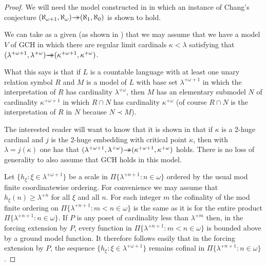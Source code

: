 \documentclass{rmmcart}
\theoremstyle{plain}
\theoremstyle{definition}
\theoremstyle{remark}
\theoremstyle{plain}
\theoremstyle{definition}
\theoremstyle{remark}
\begin{document}
            \begin{proof}
            We will need the model constructed in \cite{MR1045371} in
             which an instance of Chang's conjecture
             $(\aleph_{\omega+1},\aleph_\omega) \rlap{$\rightarrow$}\,{\rightarrow}
             (\aleph_1,\aleph_0)$ is shown to hold.

            We can take as a given (as shown in \cite[Theorem 5]{MR1045371}) that we may
            assume that we have a model $V$
            of GCH in which there are regular limit cardinals $\kappa<\lambda$
            satisfying that
            $(\lambda^{+\omega+1},\lambda^{+\omega})\rlap{$\rightarrow$}\,{\rightarrow}
            (\kappa^{+\omega+1},\kappa^{+\omega})$.


            What this says is that if $L$ is a countable language
            with at least one unary relation symbol $R$ and
             $M$ is a model of $L$  with base set $\lambda^{+\omega+1}$
            in which the interpretation of $R$ has cardinality
             $\lambda^{+\omega}$, then $M$ has an elementary submodel
             $N$ of cardinality $\kappa^{+\omega+1}$ in which
            $R\cap N$ has cardinality $\kappa^{+\omega}$ (of course
             $R\cap N$ is the interpretation of $R$ in $N$ because
            $N\prec M$).

            The interested reader will want to know that it is shown in
            \cite{MR1045371} that if $\kappa$ is a 2-huge cardinal
            and $j$ is the 2-huge
            embedding with critical point $\kappa$, then with
             $\lambda = j(\kappa)$ one has that
            $(\lambda^{+\omega+1},\lambda^{+\omega})\rlap{$\rightarrow$}\,{\rightarrow}
            (\kappa^{+\omega+1},\kappa^{+\omega})$ holds. There is no loss of
            generality to  also assume that GCH holds in this model.



            Let $\{ h_\xi : \xi \in \lambda^{+\omega+1}\}$
            be a scale in $\Pi\{ \lambda^{+n+1} : n\in \omega\}$
             ordered by the usual mod finite coordinatewise
            ordering. For convenience we may assume that $h_\xi(n) \geq
            \lambda^{+n}$ for all $\xi$ and all $n$. For each integer
             $m$ the cofinality of the mod finite ordering on
             $\Pi\{ \lambda^{+n+1} : m< n\in \omega\}$
            is the same as it is for the entire product
             $\Pi\{ \lambda^{+n+1} : n\in \omega\}$. If $P$
            is any poset of cardinality less than
             $\lambda^{+m}$ then, in the forcing extension by $P$,
            every function in
             $\Pi\{ \lambda^{+n+1} : m< n\in \omega\}$ is bounded
            above by a ground model function.
            It therefore
            follows easily that  in the forcing
            extension by $P$,  the sequence
            $\{ h_\xi : \xi \in \lambda^{+\omega+1}\}$  remains cofinal in
             $\Pi\{ \lambda^{+n+1} : n\in \omega\}$.




\end{proof}
\end{document}
